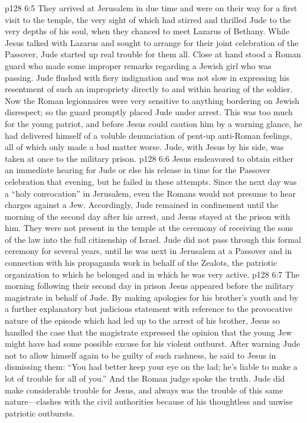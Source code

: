 \vs p128 6:5 They arrived at Jerusalem in due time and were on their way for a first visit to the temple, the very sight of which had stirred and thrilled Jude to the very depths of his soul, when they chanced to meet Lazarus of Bethany. While Jesus talked with Lazarus and sought to arrange for their joint celebration of the Passover, Jude started up real trouble for them all. Close at hand stood a Roman guard who made some improper remarks regarding a Jewish girl who was passing. Jude flushed with fiery indignation and was not slow in expressing his resentment of such an impropriety directly to and within hearing of the soldier. Now the Roman legionnaires were very sensitive to anything bordering on Jewish disrespect; so the guard promptly placed Jude under arrest. This was too much for the young patriot, and before Jesus could caution him by a warning glance, he had delivered himself of a voluble denunciation of pent\hyp{}up anti\hyp{}Roman feelings, all of which only made a bad matter worse. Jude, with Jesus by his side, was taken at once to the military prison.\plusone
\vs p128 6:6 Jesus endeavored to obtain either an immediate hearing for Jude or else his release in time for the Passover celebration that evening, but he failed in these attempts. Since the next day was a “holy convocation” in Jerusalem, even the Romans would not presume to hear charges against a Jew. Accordingly, Jude remained in confinement until the morning of the second day after his arrest, and Jesus stayed at the prison with him. They were not present in the temple at the ceremony of receiving the sons of the law into the full citizenship of Israel. Jude did not pass through this formal ceremony for several years, until he was next in Jerusalem at a Passover and in connection with his propaganda work in behalf of the Zealots, the patriotic organization to which he belonged and in which he was very active.
\vs p128 6:7 The morning following their second day in prison Jesus appeared before the military magistrate in behalf of Jude. By making apologies for his brother’s youth and by a further explanatory but judicious statement with reference to the provocative nature of the episode which had led up to the arrest of his brother, Jesus so handled the case that the magistrate expressed the opinion that the young Jew might have had some possible excuse for his violent outburst. After warning Jude not to allow himself again to be guilty of such rashness, he said to Jesus in dismissing them: “You had better keep your eye on the lad; he’s liable to make a lot of trouble for all of you.” And the Roman judge spoke the truth. Jude did make considerable trouble for Jesus, and always was the trouble of this same nature---clashes with the civil authorities because of his thoughtless and unwise patriotic outbursts.
